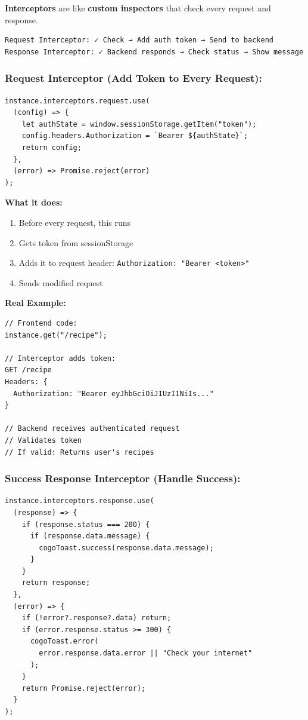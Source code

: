 \documentclass[12pt]{article}
\begin{document}
\textbf{Interceptors} are like \textbf{custom inspectors} that check every request and response.

\begin{lstlisting}
Request Interceptor: ✓ Check → Add auth token → Send to backend
Response Interceptor: ✓ Backend responds → Check status → Show message
\end{lstlisting}

\subsubsection*{Request Interceptor (Add Token to Every Request):}

\begin{lstlisting}
instance.interceptors.request.use(
  (config) => {
    let authState = window.sessionStorage.getItem("token");
    config.headers.Authorization = `Bearer ${authState}`;
    return config;
  },
  (error) => Promise.reject(error)
);
\end{lstlisting}

\textbf{What it does:}

\begin{enumerate}
    \item Before every request, this runs
    \item Gets token from sessionStorage
    \item Adds it to request header: \texttt{Authorization: "Bearer <token>"}
    \item Sends modified request
\end{enumerate}

\textbf{Real Example:}

\begin{lstlisting}
// Frontend code:
instance.get("/recipe");

// Interceptor adds token:
GET /recipe
Headers: {
  Authorization: "Bearer eyJhbGciOiJIUzI1NiIs..."
}

// Backend receives authenticated request
// Validates token
// If valid: Returns user's recipes
\end{lstlisting}

\subsubsection*{Success Response Interceptor (Handle Success):}

\begin{lstlisting}
instance.interceptors.response.use(
  (response) => {
    if (response.status === 200) {
      if (response.data.message) {
        cogoToast.success(response.data.message);
      }
    }
    return response;
  },
  (error) => {
    if (!error?.response?.data) return;
    if (error.response.status >= 300) {
      cogoToast.error(
        error.response.data.error || "Check your internet"
      );
    }
    return Promise.reject(error);
  }
);
\end{lstlisting}
\end{document}
